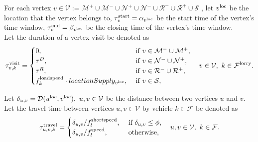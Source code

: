 For each vertex
$v \in \mathcal V := \mathcal M^{+} \cup \mathcal M^{-} \cup \mathcal N^{+} \cup \mathcal N^{-} \cup  \mathcal R^- \cup \mathcal R^+ \cup \mathcal S $ ,
let $v^{\rm loc}$
be the location that the vertex belongs to,
$\tau^{\rm start}_v = \alpha_{v^{\rm loc}}$
be the start time of the vertex's time window,
$\tau^{\rm end}_v = \beta_{v^{\rm loc}}$
be the closing time of the vertex's time window.
\\
%
%


Let the duration of a vertex visit be denoted as
\begin{align}
  \tau^{\rm visit}_{v,k} =
  \begin{cases}
    0      , & \text{ if }   v \in \mathcal M^- \cup \mathcal M^+,  \\
    \tau^D , & \text{ if }   v \in \mathcal N^- \cup \mathcal N^+,  \\
    \tau^R , & \text{ if }   v \in \mathcal R^- \cup \mathcal R^+, \\
    f_k^{\rm loadspeed} \cdot locationSupply_{v^{\rm loc}},
     & \text{ if }   v \in \mathcal S ,
  \end{cases}
  \quad v \in \mathcal V,
  \ k \in \mathcal F^{\rm lorry}.
\end{align}

Let
$\delta_{u,v} = \mathcal D(u^{\rm loc},v^{\rm loc}) , \ u,v \in \mathcal V$
be the distance between two vertices $u$ and $v$. \\


Let the travel time between vertices $u,v \in \mathcal V$ by vehicle $k \in \mathcal F$  be denoted as
\begin{align}
  \tau^{\rm travel}_{u,v,k} =
  \begin{cases}
    \delta_{u,v} / f_l^{\rm shortspeed} ,
    & \text{ if }   \delta_{u,v} \leq \phi,  \\
    \delta_{u,v} / f_l^{\rm speed} ,
    & \text{  otherwise},
  \end{cases}
  \quad u,v \in \mathcal V,
  \ k \in \mathcal F.
\end{align}


